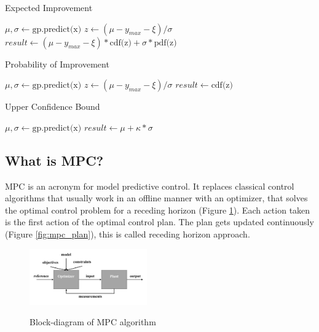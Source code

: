 \documentclass[twoside,twocolumn]{article}
\begin{document}
\begin{algorithm}
    \caption{Expected Improvement}
    \label{alg:ei}
    \begin{algorithmic}
        \State $\mu, \sigma \gets \text{gp.predict(x)}$
        \State $z \gets (\mu - y_{max} - \xi)/\sigma$
        \State $result \gets (\mu - y_{max} - \xi) * \text{cdf(z)} + \sigma * \text{pdf(z)}$
    \end{algorithmic}
\end{algorithm}

\begin{algorithm}
    \caption{Probability of Improvement}
    \label{alg:poi}
    \begin{algorithmic}
        \State $\mu, \sigma \gets \text{gp.predict(x)}$
        \State $z \gets (\mu - y_{max} - \xi)/\sigma$
        \State $result \gets \text{cdf(z)}$
    \end{algorithmic}
\end{algorithm}

\begin{algorithm}
    \caption{Upper Confidence Bound}
    \label{alg:ucb}
    \begin{algorithmic}
        \State $\mu, \sigma \gets \text{gp.predict(x)}$
        \State $result \gets \mu + \kappa * \sigma$
    \end{algorithmic}
\end{algorithm}

\subsection{What is MPC?}
MPC is an acronym for model predictive control.
It replaces classical control algorithms that usually work in an offline manner with an optimizer, that solves the optimal control problem for a receding horizon (Figure \ref{fig:mpc}).
Each action taken is the first action of the optimal control plan.
The plan gets updated continuously (Figure \ref{fig:mpc_plan}), this is called receding horizon approach.

\begin{figure}[h]
    \caption{Block-diagram of MPC algorithm}
    \centering
    \includegraphics[width=0.45\textwidth]{fig_mpc.pdf}
    \label{fig:mpc}
\end{figure}
\end{document}
